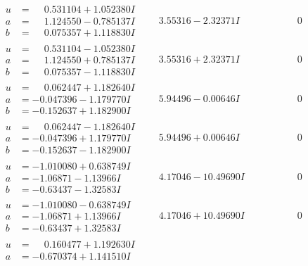 \documentclass[1p]{elsarticle_modified}
\theoremstyle{definition}
\begin{document}
$$\begin{array}{c|c|c}
 \hline 
\begin{aligned}
u &= \phantom{-}0.531104 + 1.052380 I \\
a &= \phantom{-}1.124550 - 0.785137 I \\
b &= \phantom{-}0.075357 + 1.118830 I\end{aligned}
 & \phantom{-}3.55316 - 2.32371 I & \phantom{-0.000000 } 0 \\ \hline\begin{aligned}
u &= \phantom{-}0.531104 - 1.052380 I \\
a &= \phantom{-}1.124550 + 0.785137 I \\
b &= \phantom{-}0.075357 - 1.118830 I\end{aligned}
 & \phantom{-}3.55316 + 2.32371 I & \phantom{-0.000000 } 0 \\ \hline\begin{aligned}
u &= \phantom{-}0.062447 + 1.182640 I \\
a &= -0.047396 - 1.179770 I \\
b &= -0.152637 + 1.182900 I\end{aligned}
 & \phantom{-}5.94496 - 0.00646 I & \phantom{-0.000000 } 0 \\ \hline\begin{aligned}
u &= \phantom{-}0.062447 - 1.182640 I \\
a &= -0.047396 + 1.179770 I \\
b &= -0.152637 - 1.182900 I\end{aligned}
 & \phantom{-}5.94496 + 0.00646 I & \phantom{-0.000000 } 0 \\ \hline\begin{aligned}
u &= -1.010080 + 0.638749 I \\
a &= -1.06871 - 1.13966 I \\
b &= -0.63437 - 1.32583 I\end{aligned}
 & \phantom{-}4.17046 - 10.49690 I & \phantom{-0.000000 } 0 \\ \hline\begin{aligned}
u &= -1.010080 - 0.638749 I \\
a &= -1.06871 + 1.13966 I \\
b &= -0.63437 + 1.32583 I\end{aligned}
 & \phantom{-}4.17046 + 10.49690 I & \phantom{-0.000000 } 0 \\ \hline\begin{aligned}
u &= \phantom{-}0.160477 + 1.192630 I \\
a &= -0.670374 + 1.141510 I \\

\end{aligned}
\end{array}$$
\end{document}
